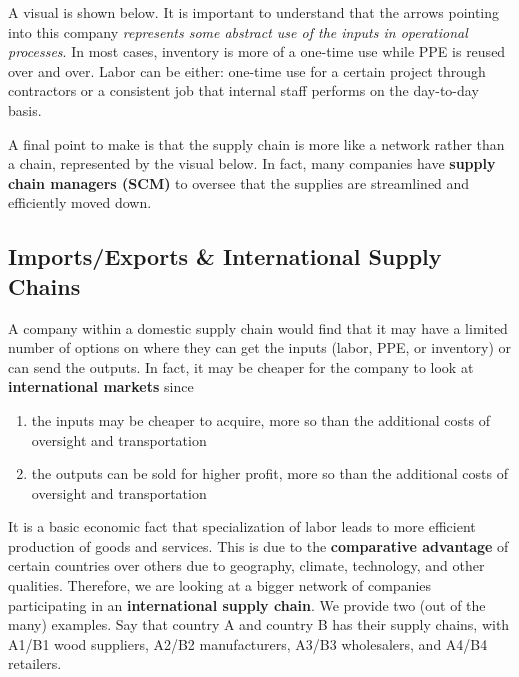 \documentclass{article}
\begin{document}
    A visual is shown below. It is important to understand that the arrows pointing into this company \textit{represents some abstract use of the inputs in operational processes}. In most cases, inventory is more of a one-time use while PPE is reused over and over. Labor can be either: one-time use for a certain project through contractors or a consistent job that internal staff performs on the day-to-day basis.

    \begin{center}
    \end{center}

    A final point to make is that the supply chain is more like a network rather than a chain, represented by the visual below. In fact, many companies have \textbf{supply chain managers (SCM)} to oversee that the supplies are streamlined and efficiently moved down.

    \begin{center}
    \end{center}

  \subsection{Imports/Exports \& International Supply Chains}

    A company within a domestic supply chain would find that it may have a limited number of options on where they can get the inputs (labor, PPE, or inventory) or can send the outputs. In fact, it may be cheaper for the company to look at \textbf{international markets} since

    \begin{enumerate}
      \item the inputs may be cheaper to acquire, more so than the additional costs of oversight and transportation
      \item the outputs can be sold for higher profit, more so than the additional costs of oversight and transportation
    \end{enumerate}

    It is a basic economic fact that specialization of labor leads to more efficient production of goods and services. This is due to the \textbf{comparative advantage} of certain countries over others due to geography, climate, technology, and other qualities. Therefore, we are looking at a bigger network of companies participating in an \textbf{international supply chain}. We provide two (out of the many) examples. Say that country A and country B has their supply chains, with A1/B1 wood suppliers, A2/B2 manufacturers, A3/B3 wholesalers, and A4/B4 retailers.
\end{document}
